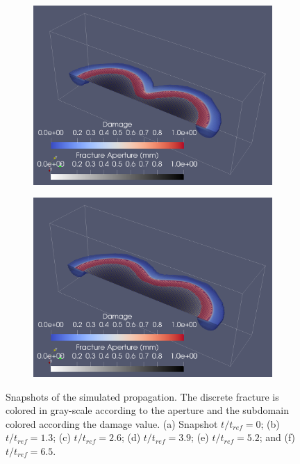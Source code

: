 \begin{figure}[h]
\begin{subfigure}{.45\textwidth}
  \centering
  \includegraphics[width=\linewidth]{Chapter4/figures/merging/merging_t_42.png}
  \caption{}
  \label{fig:merge_t_4}
\end{subfigure}
\hspace{0.85cm}
\begin{subfigure}{.45\textwidth}
  \centering
  \includegraphics[width=\linewidth]{Chapter4/figures/merging/merging_t_67.png}
  \caption{}
  \label{fig:merge_t_5}
\end{subfigure}
  \caption{Snapshots of the simulated propagation. The discrete fracture is colored in gray-scale according to the aperture and the subdomain colored according the damage value. (a) Snapshot $t/t_{ref} = 0$; (b) $t/t_{ref} = 1.3$; (c) $t/t_{ref} = 2.6$; (d) $t/t_{ref} = 3.9$; (e) $t/t_{ref} = 5.2$; and (f) $t/t_{ref} = 6.5$. } 
  \label{fig:merge_snapshots}  
\end{figure}

\FloatBarrier



